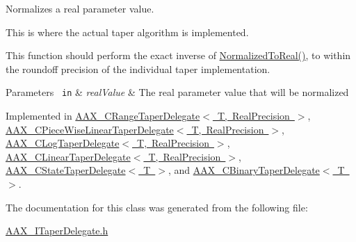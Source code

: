 Normalizes a real parameter value. 

This is where the actual taper algorithm is implemented.

This function should perform the exact inverse of \mbox{\hyperlink{a01881_a0aea0765b42855205bfab84673a2de33}{Normalized\+To\+Real()}}, to within the roundoff precision of the individual taper implementation.


\begin{DoxyParams}[1]{Parameters}
\mbox{\texttt{ in}}  & {\em real\+Value} & The real parameter value that will be normalized \\
\hline
\end{DoxyParams}


Implemented in \mbox{\hyperlink{a01557_a457a42ac3e78debf4c595ac1afeec7cf}{A\+A\+X\+\_\+\+C\+Range\+Taper\+Delegate$<$ T, Real\+Precision $>$}}, \mbox{\hyperlink{a01553_a5882df4a8f80ca2a88b512e87e7b36bc}{A\+A\+X\+\_\+\+C\+Piece\+Wise\+Linear\+Taper\+Delegate$<$ T, Real\+Precision $>$}}, \mbox{\hyperlink{a01497_abcc5e51eebe04ff347de512a103880de}{A\+A\+X\+\_\+\+C\+Log\+Taper\+Delegate$<$ T, Real\+Precision $>$}}, \mbox{\hyperlink{a01493_a7949f3c1608fd85848ac4c09c0107690}{A\+A\+X\+\_\+\+C\+Linear\+Taper\+Delegate$<$ T, Real\+Precision $>$}}, \mbox{\hyperlink{a01569_af693a54c4a61ebc507fcc1a212585824}{A\+A\+X\+\_\+\+C\+State\+Taper\+Delegate$<$ T $>$}}, and \mbox{\hyperlink{a01457_aa27dfc33b38aef729c4cd499d90317a1}{A\+A\+X\+\_\+\+C\+Binary\+Taper\+Delegate$<$ T $>$}}.



The documentation for this class was generated from the following file\+:\begin{DoxyCompactItemize}
\item 
\mbox{\hyperlink{a00638}{A\+A\+X\+\_\+\+I\+Taper\+Delegate.\+h}}\end{DoxyCompactItemize}
